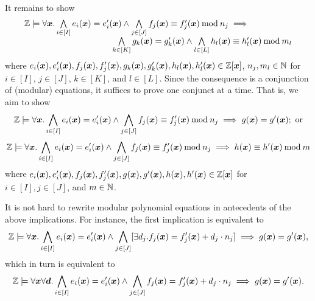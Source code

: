
It remains to show 
\[
\begin{array}{l}
  \bbfZ \models \forall \vx. %
  \bigwedge\limits_{i \in [I]} e_i (\vx) = e'_i (\vx) \wedge
  \bigwedge\limits_{j \in [J]} f_j (\vx) \equiv f'_j (\vx) \mod n_j
  \implies
  \\
  \hspace{.3\textwidth}
  \bigwedge\limits_{k \in [K]} g_k (\vx) = g'_k (\vx) \wedge
  \bigwedge\limits_{l \in [L]} h_l (\vx) \equiv h'_l (\vx) \mod m_l
\end{array}
\]
where
$e_i (\vx), e'_i (\vx), f_j (\vx), f'_j (\vx),
 g_k (\vx), g'_k (\vx), h_l (\vx), h'_l (\vx) \in
 \bbfZ[\vx]$, $n_j, m_l \in \mathbb{N}$ for $i \in [I]$, $j \in [J]$, $k
 \in [K]$, and $l \in [L]$. Since the
consequence is a conjunction of (modular) equations, it suffices to 
prove one conjunct at a time. That is, we aim to show
\begin{equation*}
  \label{eq:polynomial-equation-implicant}
  \bbfZ \models \forall \vx. %
  \bigwedge\limits_{i \in [I]} e_i (\vx) = e'_i (\vx) \wedge
  \bigwedge\limits_{j \in [J]} f_j (\vx) \equiv f'_j (\vx) \mod n_j
  \implies
  g (\vx) = g' (\vx); \textmd{ or}
\end{equation*}
 \begin{equation*}
   \label{eq:modular-polynomial-equation-implicant}
   \bbfZ \models \forall \vx. %
   \bigwedge\limits_{i \in [I]} e_i (\vx) = e'_i (\vx) \wedge
   \bigwedge\limits_{j \in [J]} f_j (\vx) \equiv f'_j (\vx) \mod n_j
   \implies
   h (\vx) \equiv h' (\vx) \mod m
 \end{equation*}
where $e_i (\vx), e'_i (\vx), f_j (\vx), f'_j (\vx), g (\vx), g'
(\vx), h (\vx), h' (\vx)
\in \bbfZ[\vx]$ for $i \in [I], j \in [J]$, and $m \in \mathbb{N}$. 

It is not hard to rewrite modular polynomial equations in antecedents
of the above implications. For instance, the first implication is
equivalent to 
\[
\bbfZ \models \forall \vx. %
\bigwedge\limits_{i \in [I]} e_i (\vx) = e'_i (\vx) \wedge
\bigwedge\limits_{j \in [J]} [\exists d_j. f_j (\vx) = f'_j (\vx) + d_j \cdot n_j]
\implies
g (\vx) = g' (\vx),
\]
which in turn is equivalent to
\[
\bbfZ \models \forall \vx \forall \vd. %
\bigwedge\limits_{i \in [I]} e_i (\vx) = e'_i (\vx) \wedge
\bigwedge\limits_{j \in [J]} f_j (\vx) = f'_j (\vx) + d_j \cdot n_j
\implies
g (\vx) = g' (\vx).
\]

